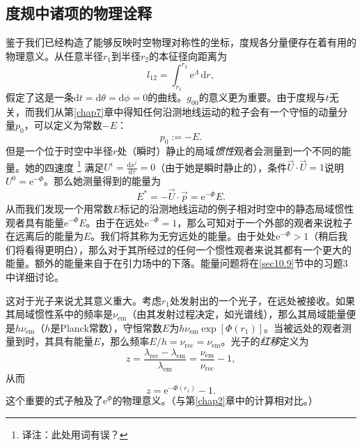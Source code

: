 \subsection*{度规中诸项的物理诠释}
鉴于我们已经构造了能够反映时空物理对称性的坐标，度规各分量便存在着有用的物理意义。从任意半径$r_1$到半径$r_2$的本征径向距离为
\begin{equation}
l_{12}=\int_{r_1}^{r_2}\mathrm e^{\Lambda}\,\mathrm dr,
\end{equation}
假定了这是一条$\mathrm dt=\mathrm d\theta=\mathrm d\phi=0$的曲线。$g_{00}$的意义更为重要。由于度规与$t$无关，而我们从第\ref{chap7}章中得知任何沿测地线运动的粒子会有一个守恒的动量分量$p_0$，可以定义为常数$-E$：
\begin{equation}
p_0:=-E.
\end{equation}
但是一个位于时空中半径$r$处（瞬时）静止的局域{\it 惯性}观者会测量到一个不同的能量。她的四速度%
\footnote{译注：此处用词有误？}%
满足$U^i=\frac{\mathrm dx^i}{\mathrm d\tau}=0$（由于她是瞬时静止的），条件$\vec{U}\cdot\vec{U}=1$说明$U^0=\mathrm e^{-\Phi}$。那么她测量得到的能量为
\begin{equation}
E^*=-\vec{U}\cdot\vec{p}=\mathrm e^{-\Phi}E.
\end{equation}
从而我们发现一个用常数$E$标记的沿测地线运动的例子相对时空中的静态局域惯性观者具有能量$\mathrm e^{-\Phi}E$。由于在远处$\mathrm e^{-\Phi}=1$，那么可知对于一个外部的观者来说粒子在远离后的能量为$E$。我们将其称为无穷远处的能量。由于处处$\mathrm e^{-\Phi}>1$（稍后我们将看得更明白），那么对于其所经过的任何一个惯性观者来说其都有一个更大的能量。额外的能量来自于在引力场中的下落。能量问题将在\ref{sec10.9}节中的习题3中详细讨论。

这对于光子来说尤其意义重大。考虑$r_1$处发射出的一个光子，在远处被接收。如果其局域惯性系中的频率是$\nu_\text{em}$（由其发射过程决定，如光谱线），那么其局域能量便是$h\nu_\text{em}$（$h$是Planck常数），守恒常数$E$为$h\nu_\text{em}\exp[\Phi(r_1)]$。当被远处的观者测量到时，其具有能量$E$，那么频率$E/h=\nu_\text{rec}=\nu_\text{em}$。光子的{\it 红移}定义为
\begin{equation}
z=\frac{\lambda_\text{rec}-\lambda_\text{em}}{\lambda_\text{em}}=\frac{\nu_\text{em}}{\nu_\text{rec}}-1,
\end{equation}
从而
\begin{equation}%
z=\mathrm e^{-\Phi(r_1)}-1.
\end{equation}
这个重要的式子触及了$\mathrm e^\Phi$的物理意义。（与第\ref{chap2}章中的计算相对比。）

